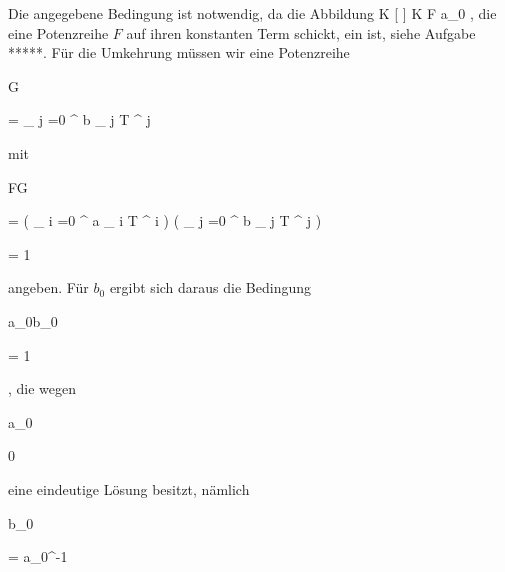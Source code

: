 {


Die angegebene Bedingung ist notwendig, da die Abbildung
\maabbeledisp {} { K [ \![ T]\! ] } { K
} { F } {a_0
} {,}
die eine Potenzreihe $F$ auf ihren konstanten Term schickt, ein
ist, siehe
Aufgabe *****.
Für die Umkehrung müssen wir eine Potenzreihe


\mavergleichskette

{\vergleichskette

{G
}

{ = }{ {\sum }_{  j =0 }^{ \infty }  b _{  j  }  T  ^{  j  }
}

{  }{
}

{    }{
}

{   }{
}

}
{}{}{}
mit


\mavergleichskettedisp

{\vergleichskette

{ FG
}

{ =} { \left(  {\sum }_{  i =0 }^{ \infty }  a _{  i  }  T  ^{  i  }  \right) \left(  {\sum }_{  j =0 }^{ \infty }  b _{  j  }  T  ^{  j  }  \right)
}

{ =} { 1
}

{ } {
}

{ } {
}

}
{}{}{}
angeben. Für $b_0$ ergibt sich daraus die Bedingung


\mavergleichskette

{\vergleichskette

{ a_0b_0
}

{ = }{ 1
}

{  }{
}

{    }{
}

{   }{
}

}
{}{}{,}
die wegen


\mavergleichskette

{\vergleichskette

{a_0
}

{ \neq }{ 0
}

{  }{
}

{    }{
}

{   }{
}

}
{}{}{}
eine eindeutige Lösung besitzt, nämlich


\mavergleichskette

{\vergleichskette

{ b_0
}

{ = }{ a_0^{-1}
}

{  }{
}

}}
